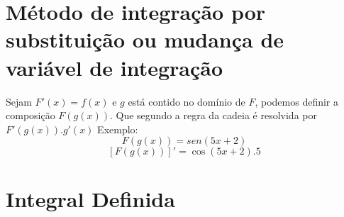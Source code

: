 \documentclass{article}
\begin{document}
			\section{Método de integração por substituição ou mudança de variável de integração}
			Sejam $F'(x)=f(x)$ e $g$ está contido no domínio de $F$, podemos definir a composição $F(g(x))$. Que segundo a regra da cadeia é resolvida por $F'(g(x)).g'(x)$
			Exemplo:
				$$F(g(x)) = sen(5x+2)$$
				$$[F(g(x))]' = \cos (5x+2).5$$
			\section{Integral Definida}
\end{document}
